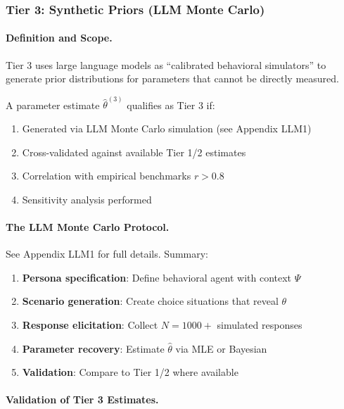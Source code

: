 \subsubsection{Tier 3: Synthetic Priors (LLM Monte Carlo)}

\paragraph{Definition and Scope.}

Tier 3 uses large language models as ``calibrated behavioral simulators'' to 
generate prior distributions for parameters that cannot be directly measured.

\begin{definition}
A parameter estimate $\hat{\theta}^{(3)}$ qualifies as Tier 3 if:
\begin{enumerate}
    \item Generated via LLM Monte Carlo simulation (see Appendix LLM1)
    \item Cross-validated against available Tier 1/2 estimates
    \item Correlation with empirical benchmarks $r > 0.8$
    \item Sensitivity analysis performed
\end{enumerate}
\end{definition}

\paragraph{The LLM Monte Carlo Protocol.}

See Appendix LLM1 for full details. Summary:

\begin{enumerate}
    \item \textbf{Persona specification}: Define behavioral agent with context $\Psi$
    \item \textbf{Scenario generation}: Create choice situations that reveal $\theta$
    \item \textbf{Response elicitation}: Collect $N = 1000+$ simulated responses
    \item \textbf{Parameter recovery}: Estimate $\hat{\theta}$ via MLE or Bayesian
    \item \textbf{Validation}: Compare to Tier 1/2 where available
\end{enumerate}

\paragraph{Validation of Tier 3 Estimates.}

